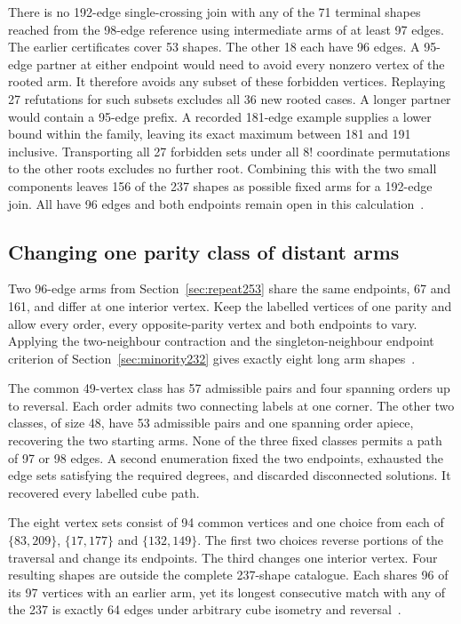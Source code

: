 \documentclass[11pt,a4paper]{article}
\theoremstyle{definition}
\theoremstyle{remark}
\begin{document}
There is no 192-edge single-crossing join with any of the 71
terminal shapes reached from the 98-edge reference using
intermediate arms of at least 97 edges. The earlier certificates
cover 53 shapes. The other 18 each have 96 edges. A 95-edge partner
at either endpoint would need to avoid every nonzero vertex of the
rooted arm. It therefore avoids any subset of these forbidden vertices.
Replaying 27 refutations for such subsets excludes all 36 new rooted
cases. A longer partner would contain a 95-edge prefix. A recorded
181-edge example supplies a lower bound within the family, leaving
its exact maximum between 181 and 191 inclusive. Transporting all
27 forbidden sets under all $8!$ coordinate permutations to the other
roots excludes no further root. Combining this with the two small
components leaves 156 of the 237 shapes as possible fixed arms for
a 192-edge join. All have 96 edges and both endpoints remain open
in this calculation~\cite{segment251,short252,repeat253}.

\subsection{Changing one parity class of distant arms}\label{sec:distant254}

Two 96-edge arms from Section~\ref{sec:repeat253} share the same
endpoints, 67 and 161, and differ at one interior vertex. Keep
the labelled vertices of one parity and allow every order, every
opposite-parity vertex and both endpoints to vary. Applying the
two-neighbour contraction and the singleton-neighbour endpoint
criterion of Section~\ref{sec:minority232} gives exactly eight
long arm shapes~\cite{distant254}.

The common 49-vertex class has 57 admissible pairs and four spanning
orders up to reversal. Each order admits two connecting labels at
one corner. The other two classes, of size 48, have 53 admissible
pairs and one spanning order apiece, recovering the two starting
arms. None of the three fixed classes permits a path of 97 or 98
edges. A second enumeration fixed the two endpoints, exhausted the
edge sets satisfying the required degrees, and discarded disconnected
solutions. It recovered every labelled cube path.

The eight vertex sets consist of 94 common vertices and one choice
from each of $\{83,209\}$, $\{17,177\}$ and $\{132,149\}$.
The first two choices reverse portions of the traversal and change
its endpoints. The third changes one interior vertex. Four resulting
shapes are outside the complete 237-shape catalogue. Each shares 96
of its 97 vertices with an earlier arm, yet its longest consecutive
match with any of the 237 is exactly 64 edges under arbitrary cube
isometry and reversal~\cite{distant254}.
\end{document}
